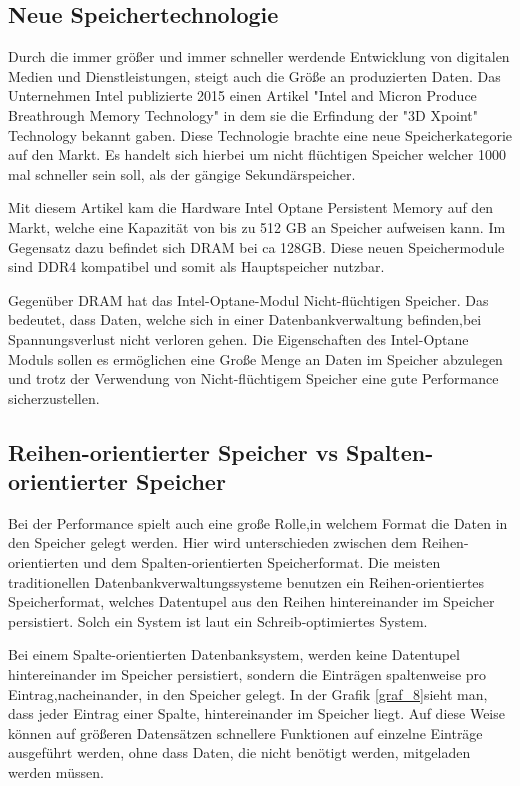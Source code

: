 \subsection{Neue Speichertechnologie}
Durch die immer größer und immer schneller werdende Entwicklung von digitalen Medien und Dienstleistungen, steigt auch die Größe an produzierten Daten. 
Das Unternehmen Intel publizierte 2015 einen Artikel "Intel and Micron Produce Breathrough Memory Technology" in dem sie die Erfindung der "3D Xpoint" Technology bekannt gaben. Diese Technologie brachte eine neue Speicherkategorie auf den Markt. Es handelt sich hierbei um nicht flüchtigen Speicher welcher 1000 mal schneller sein soll, als der gängige Sekundärspeicher. \cite{Intel:MemoryTechnology}

Mit diesem Artikel kam die Hardware Intel Optane Persistent Memory auf den Markt, welche eine Kapazität von bis zu 512 GB an Speicher aufweisen kann.
Im Gegensatz dazu befindet sich DRAM bei ca 128GB.
Diese neuen Speichermodule sind DDR4 kompatibel und somit als Hauptspeicher nutzbar. \cite{IntelOptane:Micron}

Gegenüber DRAM hat das Intel-Optane-Modul Nicht-flüchtigen Speicher. Das bedeutet, dass  Daten, welche sich in einer Datenbankverwaltung befinden,bei Spannungsverlust nicht verloren gehen.
Die Eigenschaften des Intel-Optane Moduls sollen es ermöglichen eine Große Menge an Daten im Speicher abzulegen und trotz der Verwendung von Nicht-flüchtigem Speicher eine gute Performance sicherzustellen.
 
\subsection{Reihen-orientierter Speicher vs Spalten-orientierter Speicher}
Bei der Performance spielt auch eine große Rolle,in welchem Format die Daten in den Speicher gelegt werden. Hier wird unterschieden zwischen dem Reihen-orientierten und dem Spalten-orientierten Speicherformat.
Die meisten traditionellen Datenbankverwaltungssysteme benutzen ein Reihen-orientiertes Speicherformat, welches Datentupel aus den Reihen hintereinander im Speicher persistiert. Solch ein System ist laut \cite{Stonebraker2005CStoreAC} ein \glqq{}Schreib-optimiertes System\grqq{}.

Bei einem Spalte-orientierten Datenbanksystem, werden keine Datentupel hintereinander im Speicher persistiert, sondern die Einträgen spaltenweise pro Eintrag,nacheinander, in den Speicher gelegt. In der Grafik \ref{graf_8}sieht man, dass jeder Eintrag einer Spalte, hintereinander im Speicher liegt. Auf diese Weise können auf größeren Datensätzen schnellere Funktionen auf einzelne Einträge ausgeführt werden, ohne dass Daten, die nicht benötigt werden, mitgeladen werden müssen.

